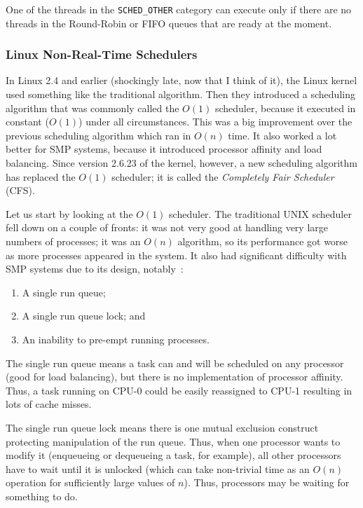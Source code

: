 One of the threads in the \texttt{SCHED\_OTHER} category can execute only if there are no threads in the Round-Robin or FIFO queues that are ready at the moment.

\subsubsection*{Linux Non-Real-Time Schedulers}
In Linux 2.4 and earlier (shockingly late, now that I think of it), the Linux kernel used something like the traditional algorithm. Then they introduced a scheduling algorithm that was commonly called the $O(1)$ scheduler, because it executed in constant ($O(1)$) under all circumstances. This was a big improvement over the previous scheduling algorithm which ran in $O(n)$ time. It also worked a lot better for SMP systems, because it introduced processor affinity and load balancing. Since version 2.6.23 of the kernel, however, a new scheduling algorithm has replaced the $O(1)$ scheduler; it is called the \textit{Completely Fair Scheduler} (CFS).

Let us start by looking at the $O(1)$ scheduler. The traditional UNIX scheduler fell down on a couple of fronts: it was not very good at handling very large numbers of processes; it was an $O(n)$ algorithm, so its performance got worse as more processes appeared in the system. It also had significant difficulty with SMP systems due to its design, notably~\cite{osi}:

\begin{enumerate}
	\item A single run queue;
	\item A single run queue lock; and
	\item An inability to pre-empt running processes.
\end{enumerate}

The single run queue means a task can and will be scheduled on any processor (good for load balancing), but there is no implementation of processor affinity. Thus, a task running on CPU-0 could be easily reassigned to CPU-1 resulting in lots of cache misses.

The single run queue lock means there is one mutual exclusion construct protecting manipulation of the run queue. Thus, when one processor wants to modify it (enqueueing or dequeueing a task, for example), all other processors have to wait until it is unlocked (which can take non-trivial time as an $O(n)$ operation for sufficiently large values of $n$). Thus, processors may be waiting for something to do.

